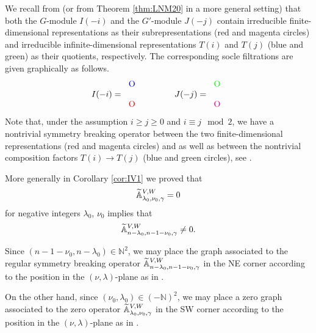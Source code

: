 \begin{example}
We recall from \cite[Chap.~1]{sbon} 
 (or from Theorem \ref{thm:LNM20} in a more general setting)
 that both the $G$-module $I(-i)$ and the $G'$-module $J(-j)$ contain 
 irreducible finite-dimensional representations
 as their subrepresentations 
 ({\color{red}red} and {\color{magenta}magenta} circles)
 and irreducible infinite-dimensional representations
 $T(i)$ and $T(j)$
 ({\color{blue}blue} and {\color{green}green})
 as their quotients,
 respectively.  
The corresponding socle filtrations are given graphically
 as follows.
\[
  I(-i)=\begin{tabular}{c} 
		\blueO \\
		\\
		\redO
	\end{tabular} 
\qquad\qquad
  J(-j)=\begin{tabular}{c} 
		\greenO \\
		\\
		\magentaO
	\end{tabular}
\]
Note that, 
 under the assumption $i \ge j \ge 0$ and $i \equiv j \mod 2$, 
 we  have a nontrivial symmetry breaking operator
 between the two finite-dimensional representations 
 ({\color{red}red} and {\color{magenta}magenta} circles)
 and as well as between the nontrivial composition factors 
 $T(i) \rightarrow T(j)$ 
 ({\color{blue}blue} and {\color{green}green} circles), 
 see \cite[Thm~1.2 (1-a)]{sbon}. 
\end{example}



\begin{example}
\label{ex:317}
More generally in Corollary \ref{cor:IV1}
 we proved that 
\[
   {\widetilde{\mathbb{A}}}_{{\lambda_0},{\nu_0},{\gamma}}^{{V,W}}= 0 
\]
for negative integers $\lambda_0$, $\nu_0$ implies that 
\[
   {\widetilde{\mathbb{A}}}_{{n-\lambda_0},{n-1-\nu_0},{\gamma}}^{{V,W}} \not = 0.  
\]

Since $({n-1-\nu_0}, {n-\lambda_0}) \in {\mathbb{N}}^2$, 
 we may place the graph associated to the regular symmetry breaking operator 
$ 
   {\widetilde{\mathbb{A}}}_{{n-\lambda_0},{n-1-\nu_0},{\gamma}}^{{V,W}}
$
 in the NE corner
 according to the position 
 in the $(\nu,\lambda)$-plane
 as in \cite[Fig.~2.1, III.A or III.B]{sbon}.  

On the other hand,
 since $(\nu_0, \lambda_0) \in (-{\mathbb{N}})^2$, 
 we may place a zero graph associated to the zero operator
 ${\widetilde{\mathbb{A}}}_{{\lambda_0},{\nu_0},{\gamma}}^{{V,W}}$
 in the SW corner 
 according to the position
 in the $(\nu,\lambda)$-plane
 as in \cite[Fig.~2.1, I.A. or I.B.]{sbon}.  
\end{example}



